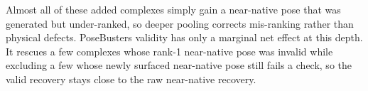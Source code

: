 
Almost all of these added complexes simply gain a near-native pose that was generated but under-ranked, so deeper pooling corrects mis-ranking rather than physical defects. PoseBusters validity has only a marginal net effect at this depth. It rescues a few complexes whose rank-1 near-native pose was invalid while excluding a few whose newly surfaced near-native pose still fails a check, so the valid recovery stays close to the raw near-native recovery.

